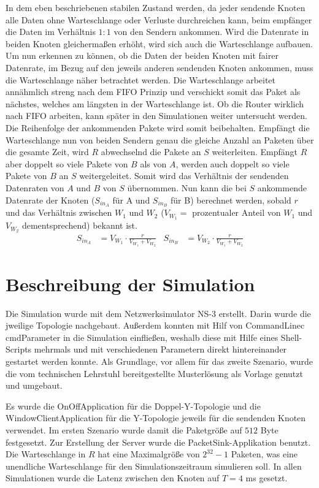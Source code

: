 \documentclass [10pt,a4paper]{article}
\begin{document}
		In dem eben beschriebenen stabilen Zustand werden, da jeder sendende Knoten alle Daten ohne Warteschlange oder Verluste durchreichen kann, beim empfänger die Daten im Verhältnis $1:1$ von den Sendern ankommen. Wird die Datenrate in beiden Knoten gleichermaßen erhöht, wird sich auch die Warteschlange aufbauen. Um nun erkennen zu können, ob die Daten der beiden Knoten mit fairer Datenrate, im Bezug auf den jeweils anderen sendenden Knoten ankommen, muss die Warteschlange näher betrachtet werden. Die Warteschlange arbeitet annähmlich streng nach dem FIFO Prinzip und verschickt somit das Paket als nächstes, welches am längsten in der Warteschlange ist. Ob die Router wirklich nach FIFO arbeiten, kann später in den Simulationen weiter untersucht werden. Die Reihenfolge der ankommenden Pakete wird somit beibehalten. Empfängt die Warteschlange nun von beiden Sendern genau die gleiche Anzahl an Paketen über die gesamte Zeit, wird $R$ abwechselnd die Pakete an $S$ weiterleiten. Empfängt $R$ aber doppelt so viele Pakete von $B$ als von $A$, werden auch doppelt so viele Pakete von $B$ an $S$ weitergeleitet. Somit wird das Verhältnis der sendenden Datenraten von $A$ und $B$ von $S$ übernommen. Nun kann die bei $S$ ankommende Datenrate der Knoten ($S_{in_A}$ für A und $S_{in_B}$ für B) berechnet werden, sobald $r$ und das Verhältnis zwischen $W_1$ und $W_2$ ($V_{W_1}=$ prozentualer Anteil von $W_1$ und $V_{W_2}$ dementsprechend) bekannt ist.
		\begin{align*}
			S_{in_A} &= V_{W_1}\cdot \frac{r}{V_{W_1}+V_{W_2}} & S_{in_B} &= V_{W_2}\cdot \frac{r}{V_{W_1}+V_{W_2}}
		\end{align*}

\section{Beschreibung der Simulation}
	Die Simulation wurde mit dem Netzwerksimulator \glqq NS-3\grqq{} erstellt. Darin wurde die jweilige Topologie nachgebaut. Außerdem konnten mit Hilf von \glqq CommandLinec cmd\grqq Parameter in die Simulation einfließen, weshalb diese mit Hilfe eines Shell-Scripts mehrmals und mit verschiedenen Parametern direkt hintereinander gestartet werden konnte. Als Grundlage, vor allem für das zweite Szenario, wurde die vom technischen Lehrstuhl bereitgestellte Musterlösung als Vorlage genutzt und umgebaut.
	
	Es wurde die OnOffApplication für die Doppel-Y-Topologie und die WindowClientApplication für die Y-Topologie jeweils für die sendenden Knoten verwendet. Im ersten Szenario wurde damit die Paketgröße auf $512$ Byte festgesetzt. Zur Erstellung der Server wurde die PacketSink-Applikation benutzt. Die Warteschlange in $R$ hat eine Maximalgröße von $2^{32}-1$ Paketen, was eine unendliche Warteschlange für den Simulationszeitraum simulieren soll. In allen Simulationen wurde die Latenz zwischen den Knoten auf $T=4$ ms gesetzt.
	
\end{document}
